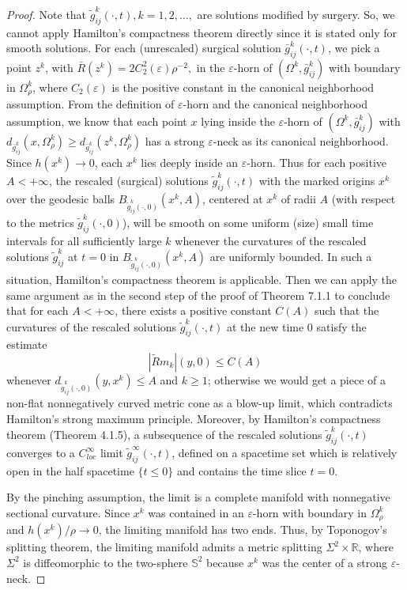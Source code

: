 \begin{proof}
Note that $\widetilde{g}^k_{ij}(\cdot,t), k=1, 2, \ldots,$ are
solutions modified by surgery. So, we cannot apply Hamilton's
compactness theorem directly since it is stated only for smooth
solutions. For each (unrescaled) surgical solution
$\bar{g}^k_{ij}(\cdot,t)$, we pick a point $z^k$, with
$\bar{R}(z^k) = 2C_2^2(\varepsilon)\rho^{-2},$ in the
$\varepsilon$-horn of $(\Omega^k,\bar{g}^k_{ij})$ with boundary in
$\Omega_\rho^k$, where $C_2(\varepsilon)$ is the positive constant
in the canonical neighborhood assumption. From the definition of
$\varepsilon$-horn and the canonical neighborhood assumption, we
know that each point $x$ lying inside the $\varepsilon$-horn of
$(\Omega^k,\bar{g}^k_{ij})$ with
$d_{\bar{g}^k_{ij}}(x,\Omega_\rho^k) \geq
d_{\bar{g}^k_{ij}}(z^k,\Omega_\rho^k)$ has a strong
$\varepsilon$-neck as its canonical neighborhood. Since
$h(x^k)\rightarrow0$, each $x^k$ lies deeply inside an
$\varepsilon$-horn. Thus for each positive $A < +\infty$, the
rescaled (surgical) solutions $\widetilde{g}^k_{ij}(\cdot,t)$ with
the marked origins $x^k$ over the geodesic balls
$B_{\widetilde{g}^k_{ij}(\cdot,0)}(x^k,A)$, centered at $x^k$ of
radii $A$ (with respect to the metrics
$\widetilde{g}^k_{ij}(\cdot,0)$), will be smooth on some uniform
(size) small time intervals for all sufficiently large $k$
whenever the curvatures of the rescaled solutions
$\widetilde{g}^k_{ij}$ at $t=0$ in
$B_{\widetilde{g}^k_{ij}(\cdot,0)}(x^k,A)$ are uniformly bounded.
In such a situation, Hamilton's compactness theorem is applicable.
Then we can apply the same argument as in the second step of the
proof of Theorem 7.1.1 to conclude that for each $A<+\infty$,
there exists a positive constant $C(A)$ such that the curvatures
of the rescaled solutions $\widetilde{g}^k_{ij}(\cdot,t)$ at the
new time $0$ satisfy the estimate $$|\widetilde{R}m_k|(y,0) \leq
C(A)$$ whenever $d_{\widetilde{g}^k_{ij}(\cdot,0)}(y,x^k) \leq A$
and $k \geq 1$; otherwise we would get a piece of a non-flat
nonnegatively curved metric cone as a blow-up limit, which
contradicts Hamilton's strong maximum principle. Moreover, by
Hamilton's compactness theorem (Theorem 4.1.5), a subsequence of
the rescaled solutions $\widetilde{g}^k_{ij}(\cdot,t)$ converges
to a $C^\infty_{loc}$ limit $\widetilde{g}^\infty_{ij}(\cdot,t)$,
defined on a spacetime set which is relatively open in the half
spacetime $\{t\leq 0\}$ and contains the time slice $t=0$.

By the pinching assumption, the limit is a complete manifold with
nonnegative sectional curvature. Since $x^k$ was contained in an
$\varepsilon$-horn with boundary in $\Omega^k_\rho$ and
$h(x^k)/\rho\rightarrow0$, the limiting manifold has two ends.
Thus, by Toponogov's splitting theorem, the limiting manifold
admits a metric splitting $\Sigma^2\times \mathbb{R}$, where
$\Sigma^2$ is diffeomorphic to the two-sphere $\mathbb{S}^2$
because $x^k$ was the center of a strong $\varepsilon$-neck.


\end{proof}

